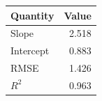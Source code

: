 \begin{tabular}{lr}
\hline
Quantity & Value \\
\hline
Slope & 2.518 \\
Intercept & 0.883 \\
RMSE & 1.426 \\
$R^2$ & 0.963 \\
\hline
\end{tabular}

